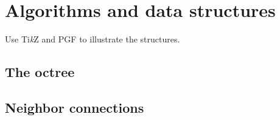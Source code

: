 \chapter{Algorithms and data structures}

Use Ti\textit{k}Z and PGF to illustrate the structures.

\section{The octree}

\section{Neighbor connections}